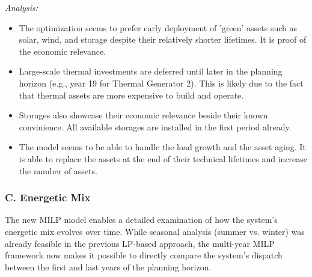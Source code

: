 \textit{Analysis:}
\vspace{-0.4em}
\begin{itemize}
    \item The optimization seems to prefer early deployment of 'green' assets such as solar, wind, 
    and storage despite their relatively shorter lifetimes. It is proof of the economic relevance.
    \item Large-scale thermal investments are deferred until later in the planning horizon 
    (e.g., year 19 for Thermal Generator 2). This is likely due to the fact that thermal assets 
    are more expensive to build and operate.
    \item Storages also showcase their economic relevance beside their known convinience. All available storages
    are installed in the first period already.
    \item The model seems to be able to handle the load growth and the asset aging. It is able to 
    replace the assets at the end of their technical lifetimes and increase the number of assets.
\end{itemize}

\subsubsection*{C. Energetic Mix}
The new MILP model enables a detailed examination of how the system's energetic mix evolves 
over time. While seasonal analysis (summer vs. winter) was already feasible in the previous 
LP-based approach, the multi-year MILP framework now makes it possible to directly compare 
the system’s dispatch between the first and last years of the planning horizon.

